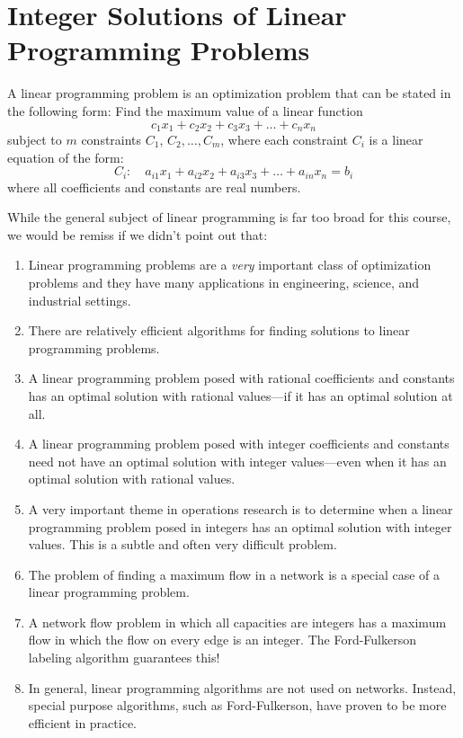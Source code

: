 \section{Integer Solutions of Linear Programming Problems}\label{s:networkflow:integer-programming}

A linear programming problem is an optimization problem that
can be stated in the following form:  Find the maximum
value of a linear function
\[
c_1x_1+c_2x_2+c_3x_3+\dots+c_n x_n
\]
subject to $m$ constraints $C_1$, $C_2,\dots,C_m$, where
each constraint $C_i$ is a linear equation of the form:
\[
C_i:\quad a_{i1}x_1+a_{i2}x_2+a_{i3}x_3+\dots+a_{in}x_n=b_i
\]
where all coefficients and constants are real numbers.

While the general subject of linear programming is far too 
broad for this course, we would be remiss if we didn't 
point out that:
\begin{enumerate}
\item Linear programming problems are a \textit{very}
important class of optimization problems and they have
many applications in engineering, science, and industrial settings.
\item There are relatively efficient algorithms for finding
solutions to linear programming problems.
\item  A linear programming problem posed with rational coefficients
and constants has an optimal solution with rational values---if it
has an optimal solution at all.
\item  A linear programming problem posed with integer coefficients
and constants need not have an optimal solution with integer values---even
when it has an optimal solution with rational values.
\item A very important theme in operations research is to determine
when a linear programming problem posed in integers has an optimal
solution with integer values.  This is a subtle and often very difficult
problem.
\item The problem of finding a maximum flow in a network is
a special case of a linear programming problem.
\item A network flow problem in which all capacities are integers
has a maximum flow in which the flow on every edge is an integer.
The Ford-Fulkerson labeling algorithm guarantees this!
\item In general, linear programming algorithms are not used
on networks.  Instead, special purpose algorithms, such as Ford-Fulkerson,
have proven to be more efficient in practice.
\end{enumerate}

